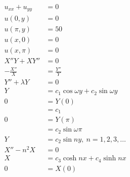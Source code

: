 \documentclass{article}
\begin{document}
\begin{align*}
  u_{x x} + u_{y y} & = 0                                                                                       \\
  u(0, y)           & = 0                                                                                       \\
  u(\pi, y)         & = 50                                                                                      \\
  u(x, 0)           & = 0                                                                                       \\
  u(x, \pi)         & = 0                                                                                       \\
  X'' Y + X Y''     & = 0                                                                                       \\
  -\frac{X''}{X}    & = \frac{Y''}{Y}                                                                           \\
  Y'' + \lambda Y   & = 0                                                                                       \\
  Y                 & = c_1 \cos \omega y + c_2 \sin \omega y                                                   \\
  0                 & = Y(0)                                                                                    \\
                    & = c_1                                                                                     \\
  0                 & = Y(\pi)                                                                                  \\
                    & = c_2 \sin \omega \pi                                                                     \\
  Y                 & = c_2 \sin n y,\ n = 1, 2, 3, \ldots                                                      \\
  X'' - n^2 X       & = 0                                                                                       \\
  X                 & = c_3 \cosh n x + c_4 \sinh n x                                                           \\
  0                 & = X(0)                                                                                    \\

\end{align*}
\end{document}
